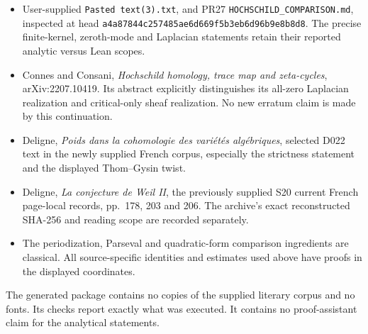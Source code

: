 \begin{itemize}
\tightlist
\item
  User-supplied \texttt{Pasted\ text(3).txt}, and PR27 \texttt{HOCHSCHILD\_COMPARISON.md}, inspected at head \texttt{a4a87844c257485ae6d669f5b3eb6d96b9e8b8d8}. The precise finite-kernel, zeroth-mode and Laplacian statements retain their reported analytic versus Lean scopes.
\item
  Connes and Consani, \emph{Hochschild homology, trace map and zeta-cycles}, arXiv:2207.10419. Its abstract explicitly distinguishes its all-zero Laplacian realization and critical-only sheaf realization. No new erratum claim is made by this continuation.
\item
  Deligne, \emph{Poids dans la cohomologie des variétés algébriques}, selected D022 text in the newly supplied French corpus, especially the strictness statement and the displayed Thom--Gysin twist.
\item
  Deligne, \emph{La conjecture de Weil II}, the previously supplied S20 current French page-local records, pp.~178, 203 and 206. The archive's exact reconstructed SHA-256 and reading scope are recorded separately.
\item
  The periodization, Parseval and quadratic-form comparison ingredients are classical. All source-specific identities and estimates used above have proofs in the displayed coordinates.
\end{itemize}

The generated package contains no copies of the supplied literary corpus and no fonts. Its checks report exactly what was executed. It contains no proof-assistant claim for the analytical statements.
